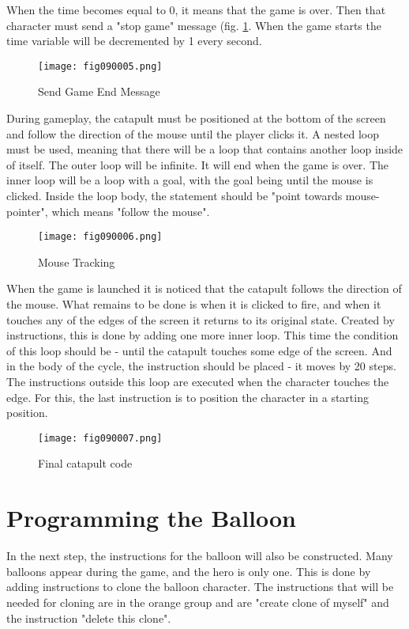 When the time becomes equal to 0, it means that the game is over. Then that character must send a "stop game" message (fig. \ref{fig090005}. When the game starts the time variable will be decremented by 1 every second.

\begin{figure}[H]
   \centering
   \texttt{[image: fig090005.png]}
   \caption{Send Game End Message}
\label{fig090005}
\end{figure}

During gameplay, the catapult must be positioned at the bottom of the screen and follow the direction of the mouse until the player clicks it. A nested loop must be used, meaning that there will be a loop that contains another loop inside of itself. The outer loop will be infinite. It will end when the game is over. The inner loop will be a loop with a goal, with the goal being until the mouse is clicked. Inside the loop body, the statement should be "point towards mouse-pointer", which means "follow the mouse".
 
\begin{figure}[H]
   \centering
   \texttt{[image: fig090006.png]}
   \caption{Mouse Tracking}
\label{fig090006}
\end{figure}

When the game is launched it is noticed that the catapult follows the direction of the mouse. What remains to be done is when it is clicked to fire, and when it touches any of the edges of the screen it returns to its original state. Created by instructions, this is done by adding one more inner loop. This time the condition of this loop should be - until the catapult touches some edge of the screen. And in the body of the cycle, the instruction should be placed - it moves by 20 steps. The instructions outside this loop are executed when the character touches the edge. For this, the last instruction is to position the character in a starting position.

\begin{figure}[H]
   \centering
   \texttt{[image: fig090007.png]}
   \caption{Final catapult code}
\label{fig090007}
\end{figure}

\section{Programming the Balloon}
In the next step, the instructions for the balloon will also be constructed. Many balloons appear during the game, and the hero is only one. This is done by adding instructions to clone the balloon character. The instructions that will be needed for cloning are in the orange group and are "create clone of myself" and the instruction "delete this clone".

